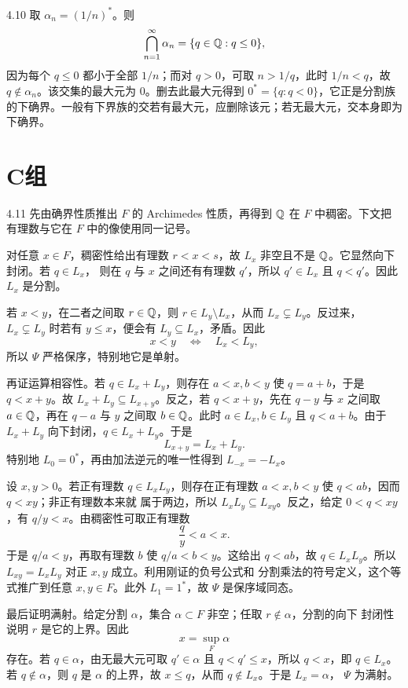 \begin{solution}{4.10}
取 \(\alpha_n=(1/n)^*\)。则
\[
 \bigcap_{n=1}^{\infty}\alpha_n=\{q\in\mathbb{Q}:q\le0\},
\]
因为每个 \(q\le0\) 都小于全部 \(1/n\)；而对 \(q>0\)，可取
\(n>1/q\)，此时 \(1/n<q\)，故 \(q\notin\alpha_n\)。该交集的最大元为 \(0\)。删去此最大元得到
\(0^*=\{q:q<0\}\)，它正是分割族的下确界。一般有下界族的交若有最大元，应删除该元；若无最大元，交本身即为下确界。
\end{solution}

\section*{C组}

\begin{solution}{4.11}
先由确界性质推出 \(F\) 的 Archimedes 性质，再得到 \(\mathbb{Q}\) 在
\(F\) 中稠密。下文把有理数与它在 \(F\) 中的像使用同一记号。

对任意 \(x\in F\)，稠密性给出有理数 \(r<x<s\)，故
\(L_x\) 非空且不是 \(\mathbb{Q}\)。它显然向下封闭。若 \(q\in L_x\)，
则在 \(q\) 与 \(x\) 之间还有有理数 \(q'\)，所以 \(q'\in L_x\)
且 \(q<q'\)。因此 \(L_x\) 是分割。

若 \(x<y\)，在二者之间取 \(r\in\mathbb{Q}\)，则
\(r\in L_y\setminus L_x\)，从而 \(L_x\subsetneq L_y\)。反过来，
\(L_x\subsetneq L_y\) 时若有 \(y\le x\)，便会有
\(L_y\subseteq L_x\)，矛盾。因此
\[
  x<y\quad\Longleftrightarrow\quad L_x<L_y,
\]
所以 \(\Psi\) 严格保序，特别地它是单射。

再证运算相容性。若 \(q\in L_x+L_y\)，则存在
\(a<x,b<y\) 使 \(q=a+b\)，于是 \(q<x+y\)。故
\(L_x+L_y\subseteq L_{x+y}\)。反之，若 \(q<x+y\)，先在
\(q-y\) 与 \(x\) 之间取 \(a\in\mathbb{Q}\)，再在 \(q-a\) 与 \(y\)
之间取 \(b\in\mathbb{Q}\)。此时 \(a\in L_x,b\in L_y\) 且
\(q<a+b\)。由于 \(L_x+L_y\) 向下封闭，\(q\in L_x+L_y\)。于是
\[
  L_{x+y}=L_x+L_y.
\]
特别地 \(L_0=0^*\)，再由加法逆元的唯一性得到
\(L_{-x}=-L_x\)。

设 \(x,y>0\)。若正有理数 \(q\in L_xL_y\)，则存在正有理数
\(a<x,b<y\) 使 \(q<ab\)，因而 \(q<xy\)；非正有理数本来就
属于两边，所以 \(L_xL_y\subseteq L_{xy}\)。反之，给定
\(0<q<xy\)，有 \(q/y<x\)。由稠密性可取正有理数
\[
  \frac qy<a<x.
\]
于是 \(q/a<y\)，再取有理数 \(b\) 使
\(q/a<b<y\)。这给出 \(q<ab\)，故 \(q\in L_xL_y\)。所以
\(L_{xy}=L_xL_y\) 对正 \(x,y\) 成立。利用刚证的负号公式和
分割乘法的符号定义，这个等式推广到任意 \(x,y\in F\)。此外
\(L_1=1^*\)，故 \(\Psi\) 是保序域同态。

最后证明满射。给定分割 \(\alpha\)，集合
\(\alpha\subset F\) 非空；任取 \(r\notin\alpha\)，分割的向下
封闭性说明 \(r\) 是它的上界。因此
\[
  x=\sup_F\alpha
\]
存在。若 \(q\in\alpha\)，由无最大元可取 \(q'\in\alpha\)
且 \(q<q'\le x\)，所以 \(q<x\)，即 \(q\in L_x\)。若
\(q\notin\alpha\)，则 \(q\) 是 \(\alpha\) 的上界，故
\(x\le q\)，从而 \(q\notin L_x\)。于是 \(L_x=\alpha\)，
\(\Psi\) 为满射。


\end{solution}

